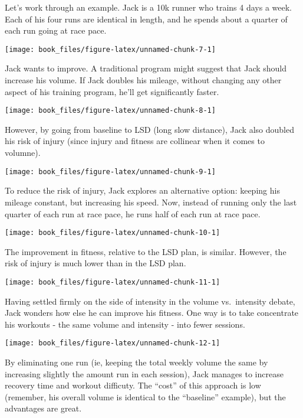 \documentclass[]{tufte-handout}
\begin{document}
Let's work through an example. Jack is a 10k runner who trains 4 days a
week. Each of his four runs are identical in length, and he spends about
a quarter of each run going at race pace.

\texttt{[image: book\_files/figure-latex/unnamed-chunk-7-1]}

Jack wants to improve. A traditional program might suggest that Jack
should increase his volume. If Jack doubles his mileage, without
changing any other aspect of his training program, he'll get
significantly faster.

\begin{marginfigure}
\texttt{[image: book\_files/figure-latex/unnamed-chunk-8-1]} \end{marginfigure}

However, by going from baseline to LSD (long slow distance), Jack also
doubled his risk of injury (since injury and fitness are collinear when
it comes to volumne).

\texttt{[image: book\_files/figure-latex/unnamed-chunk-9-1]}

To reduce the risk of injury, Jack explores an alternative option:
keeping his mileage constant, but increasing his speed. Now, instead of
running only the last quarter of each run at race pace, he runs half of
each run at race pace.

\begin{marginfigure}
\texttt{[image: book\_files/figure-latex/unnamed-chunk-10-1]} \end{marginfigure}

The improvement in fitness, relative to the LSD plan, is similar.
However, the risk of injury is much lower than in the LSD plan.

\texttt{[image: book\_files/figure-latex/unnamed-chunk-11-1]}

Having settled firmly on the side of intensity in the volume
vs.~intensity debate, Jack wonders how else he can improve his fitness.
One way is to take concentrate his workouts - the same volume and
intensity - into fewer sessions.

\begin{marginfigure}
\texttt{[image: book\_files/figure-latex/unnamed-chunk-12-1]} \end{marginfigure}

By eliminating one run (ie, keeping the total weekly volume the same by
increasing slightly the amount run in each session), Jack manages to
increase recovery time and workout difficuty. The ``cost'' of this
approach is low (remember, his overall volume is identical to the
``baseline'' example), but the advantages are great.
\end{document}
